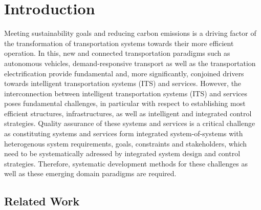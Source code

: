 \documentclass[graybox]{svmult}
\begin{document}
  \section{Introduction}
\label{sec:intro}
Meeting sustainability goals and reducing carbon emissions \cite{sachs2019six} is a driving factor of the transformation of transportation systems towards their more efficient operation. In this, new and connected transportation paradigms such as autonomous vehicles, demand-responsive transport \cite{brake_demand_2004} as well as the transportation electrification \cite{pereirinha2018main} provide fundamental and, more significantly, conjoined drivers towards intelligent transportation systems (ITS) and services.
However, the interconnection between intelligent transportation systems (ITS) and services poses fundamental challenges, in particular with respect to establishing most efficient structures, infrastructures, as well as intelligent and integrated control strategies. Quality assurance of these systems and services is a critical challenge as constituting systems and services form integrated system-of-systems with heterogenous system requirements, goals, constraints and stakeholders, which need to be systematically adressed by integrated system design and control strategies. Therefore, systematic development methods for these challenges as well as these emerging domain paradigms are required.

\vspace{-2mm}

\subsection{Related Work}
\end{document}
